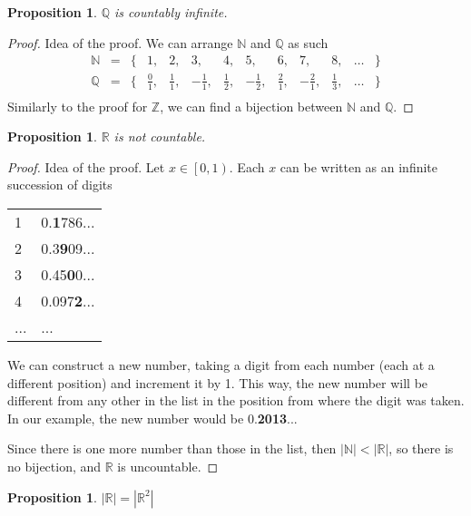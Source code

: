 \documentclass{article}
\newcommand{\bb}[1]{\mathbb{#1}}
\newcommand{\fr}[2]{\frac{#1}{#2}}
\newcommand{\intco}[1]{\left[#1\right)}
\theoremstyle{definition}
\theoremstyle{definition}
\theoremstyle{plain}
\theoremstyle{plain}
\theoremstyle{plain}
\theoremstyle{plain}
\newtheorem{proposition}[theorem]{Proposition}
\theoremstyle{definition}
\theoremstyle{remark}
\theoremstyle{remark}
\theoremstyle{remark}
\theoremstyle{remark}
\newcommand{\N}{\mathbb{N}}
\newcommand{\Z}{\mathbb{Z}}
\newcommand{\Q}{\mathbb{Q}}
\newcommand{\R}{\mathbb{R}}
\begin{document}
\begin{proposition}
  $\Q$ is countably infinite.
\end{proposition}

\begin{proof}
  Idea of the proof. We can arrange $\N$ and $\Q$ as such
  \[
  \begin{array}{lcrcccccccccl}
    \bb{N} & = & \{ & 1,         & 2,         & 3,          & 4,         & 5,          & 6,         & 7,          & 8,         & \hdots & \} \\
    \bb{Q} & = & \{ & \fr{0}{1}, & \fr{1}{1}, & -\fr{1}{1}, & \fr{1}{2}, & -\fr{1}{2}, & \fr{2}{1}, & -\fr{2}{1}, & \fr{1}{3}, & \hdots & \} \\
  \end{array}
  \]
  Similarly to the proof for $\Z$, we can find a bijection between $\N$ and $\Q$.
\end{proof}


\begin{proposition}
  $\R$ is not countable.
\end{proposition}

\begin{proof}
  Idea of the proof. Let $x \in \intco{0,1}$. Each $x$ can be written as an infinite succession of digits
  
  \begin{center}\begin{tabular}{l|l}
    1 & 0.\textbf{1}786... \\
    2 & 0.3\textbf{9}09... \\
    3 & 0.45\textbf{0}0... \\
    4 & 0.097\textbf{2}... \\
    ... & ...
  \end{tabular}\end{center}
  
  We can construct a new number, taking a digit from each number (each at a different position) and increment it by 1. This way, the new number will be different from any other in the list in the position from where the digit was taken. In our example, the new number would be 0.\textbf{2013}...

  Since there is one more number than those in the list, then $|\N| < |\R|$, so there is no bijection, and $\R$ is uncountable.
\end{proof}


\begin{proposition}
  $|\R| = |\R^2|$
\end{proposition}
\end{document}

